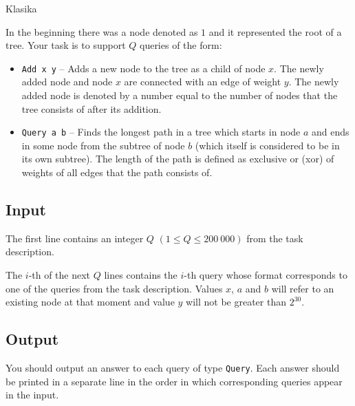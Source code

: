 \begin{statement}[
  problempoints=110,
  timelimit=1 second,
  memorylimit=512 MiB,
]{Klasika}


In the beginning there was a node denoted as $1$ and it represented the root
of a tree. Your task is to support $Q$ queries of the form:

\begin{itemize}
  \item \texttt{Add x y} -- Adds a new node to the tree as a child of node $x$.
        The newly added node and node $x$ are connected with an edge of weight
        $y$. The newly added node is denoted by a number equal to the number
        of nodes that the tree consists of after its addition.
  \item \texttt{Query a b} -- Finds the longest path in a tree which starts in
        node $a$ and ends in some node from the subtree of node $b$ (which itself
        is considered to be in its own subtree). The length of the path is defined
        as exclusive or (xor) of weights of all edges that the path consists of.
\end{itemize}

\subsection*{Input}
The first line contains an integer $Q$ $(1 \le Q \le 200\ 000)$ from the task
description.

The $i$-th of the next $Q$ lines contains the $i$-th query whose format
corresponds to one of the queries from the task description. Values $x$, $a$ and
$b$ will refer to an existing node at that moment and value $y$ will not be
greater than $2^{30}$.

\subsection*{Output}
You should output an answer to each query of type \texttt{Query}. Each
answer should be printed in a separate line in the order in which
corresponding queries appear in the input.


\end{statement}
